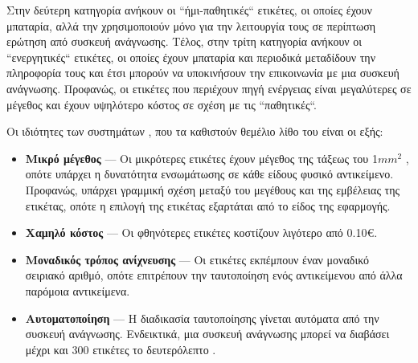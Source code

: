 Στην δεύτερη κατηγορία ανήκουν οι ``ήμι-παθητικές`` ετικέτες, οι οποίες έχουν μπαταρία, αλλά την χρησιμοποιούν μόνο για την λειτουργία τους σε περίπτωση ερώτηση από συσκευή ανάγνωσης.
Τέλος, στην τρίτη κατηγορία ανήκουν οι ``ενεργητικές`` ετικέτες, οι οποίες έχουν μπαταρία και περιοδικά μεταδίδουν την πληροφορία τους και έτσι μπορούν να υποκινήσουν την επικοινωνία με μια συσκευή ανάγνωσης.
Προφανώς, οι ετικέτες που περιέχουν πηγή ενέργειας είναι μεγαλύτερες σε μέγεθος και έχουν υψηλότερο κόστος σε σχέση με τις ``παθητικές``.
\par
Οι ιδιότητες των συστημάτων , που τα καθιστούν θεμέλιο λίθο του  είναι οι εξής:
\begin{itemize}
    \item \textbf{Μικρό μέγεθος} --- Οι μικρότερες ετικέτες  έχουν μέγεθος της τάξεως του 1\(mm^2\) \cite{smalltag}, οπότε υπάρχει η δυνατότητα ενσωμάτωσης σε κάθε είδους φυσικό αντικείμενο.
    Προφανώς, υπάρχει γραμμική σχέση μεταξύ του μεγέθους και της εμβέλειας της ετικέτας, οπότε η επιλογή της ετικέτας εξαρτάται από το είδος της εφαρμογής.
    \item \textbf{Χαμηλό κόστος} --- Οι φθηνότερες ετικέτες  κοστίζουν λιγότερο από 0.10€.
    \item \textbf{Μοναδικός τρόπος ανίχνευσης} --- Οι ετικέτες  εκπέμπουν έναν μοναδικό σειριακό αριθμό, οπότε επιτρέπουν την ταυτοποίηση ενός αντικείμενου από άλλα παρόμοια αντικείμενα.
    \item \textbf{Αυτοματοποίηση} --- Η διαδικασία ταυτοποίησης γίνεται αυτόματα από την συσκευή ανάγνωσης. Ενδεικτικά, μια συσκευή ανάγνωσης μπορεί να διαβάσει μέχρι και 300 ετικέτες το δευτερόλεπτο \cite{rainrfid}.
\end{itemize}

